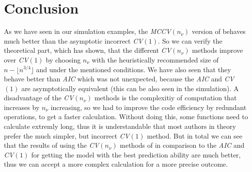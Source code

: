 \documentclass[Research_Module_ES.tex]{subfiles}
\begin{document}
\section{Conclusion}
As we have seen in our simulation examples, the \textit{MCCV$(n_\nu)$} version of \cite{shao} behaves much better than the asymptotic incorrect \textit{CV$(1)$}. So we can verify the theoretical part, which has shown, that the different \textit{CV$(n_\nu)$} methods improve over \textit{CV$(1)$} by choosing $n_\nu$ with the heuristically recommended size of $n-\lfloor
n^{3/4}\rfloor$ and under the mentioned conditions. We have also seen that they behave better than \textit{AIC} which was not unexpected, because the \textit{AIC} and \textit{CV$(1)$} are asymptotically equivalent (this can be also seen in the simulation). A disadvantage of the \textit{CV$(n_\nu)$} methods is the complexitiy of computation that increases by $n_\nu$ increasing, so we had to improve the code efficiency by redundant operations, to get a faster calculation. Without doing this, some functions need to calculate extremly long, thus it is understandable that most authors in theory prefer the much simpler, but incorrect \textit{CV$(1)$} method. But in total we can see that the results of using the \textit{CV$(n_\nu)$} methods of \cite{shao} in comparison to the \textit{AIC} and \textit{CV$(1)$} for getting the model with the best prediction ability are much better, thus we can accept a more complex calculation for a more precise outcome. 
\end{document}

